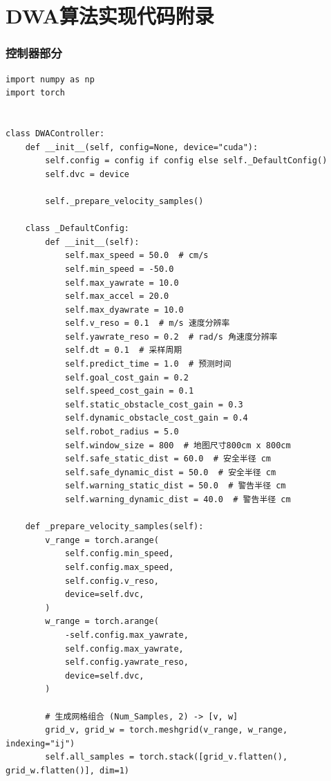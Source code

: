 \chapter{DWA算法实现代码附录}\label{chap:DWA-code}
\subsection{控制器部分}
\begin{verbatim}
import numpy as np
import torch


class DWAController:
    def __init__(self, config=None, device="cuda"):
        self.config = config if config else self._DefaultConfig()
        self.dvc = device

        self._prepare_velocity_samples()

    class _DefaultConfig:
        def __init__(self):
            self.max_speed = 50.0  # cm/s
            self.min_speed = -50.0
            self.max_yawrate = 10.0
            self.max_accel = 20.0
            self.max_dyawrate = 10.0
            self.v_reso = 0.1  # m/s 速度分辨率
            self.yawrate_reso = 0.2  # rad/s 角速度分辨率
            self.dt = 0.1  # 采样周期
            self.predict_time = 1.0  # 预测时间
            self.goal_cost_gain = 0.2
            self.speed_cost_gain = 0.1
            self.static_obstacle_cost_gain = 0.3
            self.dynamic_obstacle_cost_gain = 0.4
            self.robot_radius = 5.0
            self.window_size = 800  # 地图尺寸800cm x 800cm
            self.safe_static_dist = 60.0  # 安全半径 cm
            self.safe_dynamic_dist = 50.0  # 安全半径 cm
            self.warning_static_dist = 50.0  # 警告半径 cm
            self.warning_dynamic_dist = 40.0  # 警告半径 cm

    def _prepare_velocity_samples(self):
        v_range = torch.arange(
            self.config.min_speed,
            self.config.max_speed,
            self.config.v_reso,
            device=self.dvc,
        )
        w_range = torch.arange(
            -self.config.max_yawrate,
            self.config.max_yawrate,
            self.config.yawrate_reso,
            device=self.dvc,
        )

        # 生成网格组合 (Num_Samples, 2) -> [v, w]
        grid_v, grid_w = torch.meshgrid(v_range, w_range, indexing="ij")
        self.all_samples = torch.stack([grid_v.flatten(), grid_w.flatten()], dim=1)


\end{verbatim}
